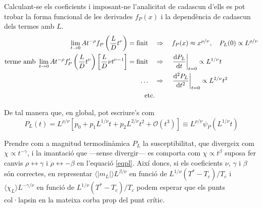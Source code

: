 \documentclass[a4paper]{article}
\begin{document}
Calculant-se els coeficients i imposant-ne l'analicitat de cadascun d'ells es pot trobar la forma funcional de les derivades $f_P (x)$ i la dependència de cadascun dels termes amb $L$.
\begin{align*}
    \lim_{t \to 0} A t^{-\rho} f_P \left(\frac{L}{D} t^\nu \right) = \text{finit} \quad &\Rightarrow \quad f_P (x) \approx x^{\rho/\nu}, \quad P_L (0) \propto L^{\rho/\nu} \\
    \text{terme amb }\lim_{t \to 0} A t^{-\rho} f'_P \left(\frac{L}{D} t^\nu \right) \left[\frac{L}{D} \nu t^{\nu -1} \right] = \text{finit} \quad &\Rightarrow \quad \left.\dv{P_L}{t} \right|_{t=0} \propto L^{1/\nu} t \\
    \dots \quad &\Rightarrow \quad \left.\dv[2]{P_L}{t} \right|_{t=0} \propto L^{2/\nu} t^2 \\
    \text{etc.} &\ 
\end{align*}

De tal manera que, en global, pot escriure's com
\begin{equation} \label{eqpl}
    P_L (t) = L^{\rho/\nu} \left[p_0 + p_1 L^{1/\nu}t + p_2 L^{2/\nu}t^2 + \mathcal{O}(t^3) \right] \equiv L^{\rho/\nu} \psi_P(L^{1/\nu}t)
\end{equation}

Prendre com a magnitud termodinàmica $P_L$ la susceptibilitat, que divergeix com $\chi \propto t^{-\gamma}$, i la imantació que ---sense divergir--- es comporta com $\chi \propto t^{\beta}$ suposa fer canvis $\rho \leftrightarrow \gamma$ i $\rho \leftrightarrow -\beta$ en l'equació \eqref{eqpl}. Així doncs, si els coeficients $\nu$, $\gamma$ i $\beta$ són correctes, en representar $\langle |m_L| \rangle L^{\beta/\nu}$ en funció de $L^{1/\nu} (T^*-T_c)/T_c$ i $\langle \chi_L \rangle L^{-\gamma/\nu}$ en funció de $L^{1/\nu} (T^*-T_c)/T_c$ podem esperar que els punts col·lapsin en la mateixa corba prop del punt crític.
\end{document}
